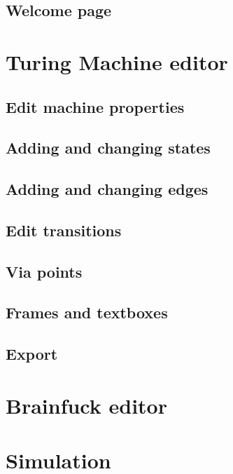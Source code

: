 \documentclass[%
  a4paper,%
  11pt,%
  blue,%
  hyperref	%
  ]{tubsartcl}
\begin{document}
\subsection{Welcome page}
\label{sec:welcome-page}


\section{Turing Machine editor}

\subsection{Edit machine properties}
\label{sec:edit-mach-prop}

\subsection{Adding and changing states}
\label{sec:add-edit-states}

\subsection{Adding and changing edges}
\label{sec:adding-chang-edges}

\subsection{Edit transitions}
\label{sec:edit-transitions}

\subsection{Via points}
\label{sec:via-points}

\subsection{Frames and textboxes}
\label{sec:frames-textboxes}

\subsection{Export}
\label{sec:export}

\section{Brainfuck editor}



\section{Simulation}
\end{document}
